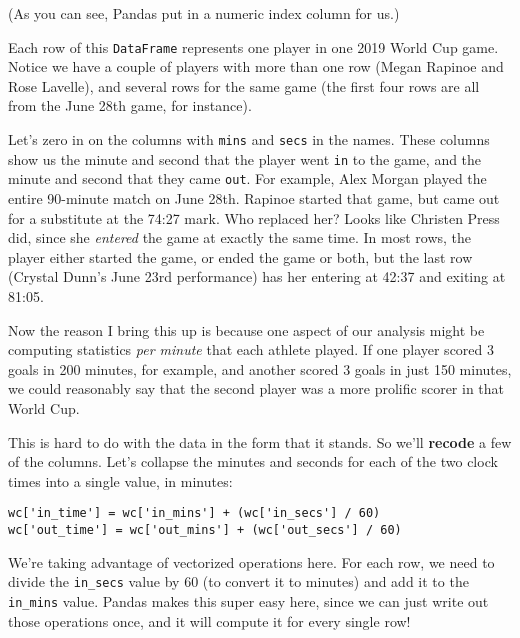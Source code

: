 (As you can see, Pandas put in a numeric index column for us.)

Each row of this \texttt{DataFrame} represents one player in one 2019 World Cup
game. Notice we have a couple of players with more than one row (Megan Rapinoe
and Rose Lavelle), and several rows for the same game (the first four rows are
all from the June 28th game, for instance).

Let's zero in on the columns with \texttt{mins} and \texttt{secs} in the names.
These columns show us the minute and second that the player went \texttt{in} to
the game, and the minute and second that they came \texttt{out}. For example,
Alex Morgan played the entire 90-minute match on June 28th. Rapinoe started
that game, but came out for a substitute at the 74:27 mark. Who replaced her?
Looks like Christen Press did, since she \textit{entered} the game at exactly
the same time. In most rows, the player either started the game, or ended the
game or both, but the last row (Crystal Dunn's June 23rd performance) has her
entering at 42:37 and exiting at 81:05.

Now the reason I bring this up is because one aspect of our analysis might be
computing statistics \textit{per minute} that each athlete played. If one
player scored 3 goals in 200 minutes, for example, and another scored 3 goals
in just 150 minutes, we could reasonably say that the second player was a more
prolific scorer in that World Cup.


This is hard to do with the data in the form that it stands. So we'll
\textbf{recode} a few of the columns. Let's collapse the minutes and seconds
for each of the two clock times into a single value, in minutes:

\begin{Verbatim}[fontsize=\small,samepage=true,frame=single,framesep=3mm]
wc['in_time'] = wc['in_mins'] + (wc['in_secs'] / 60)
wc['out_time'] = wc['out_mins'] + (wc['out_secs'] / 60)
\end{Verbatim}


We're taking advantage of vectorized operations here. For each row, we need to
divide the \texttt{in\_secs} value by 60 (to convert it to minutes) and add it
to the \texttt{in\_mins} value. Pandas makes this super easy here, since we can
just write out those operations once, and it will compute it for every single
row!

